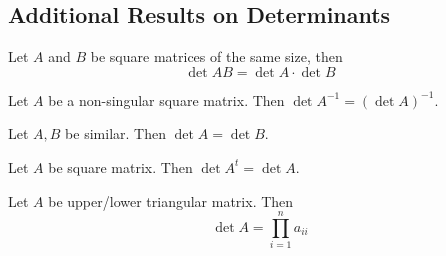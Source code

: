 \documentclass{article}
\begin{document}
\subsection{Additional Results on Determinants}
\begin{theorem}
  Let $A$ and $B$ be square matrices of the same size, then \[
    \det AB = \det A \cdot \det B
  \]
\end{theorem}
\begin{theorem}
  Let $A$ be a non-singular square matrix. Then $\det A^{-1} = (\det A)^{-1}$.
\end{theorem}
\begin{theorem}
  Let $A, B$ be similar. Then $\det A = \det B$.
\end{theorem}
\begin{theorem}
  Let $A$ be square matrix. Then $\det A^t = \det A$.
\end{theorem}
\begin{theorem}
  Let $A$ be upper/lower triangular matrix. Then \[
    \det A = \prod_{i=1}^n a_{ii}
  \]
\end{theorem}
\end{document}
